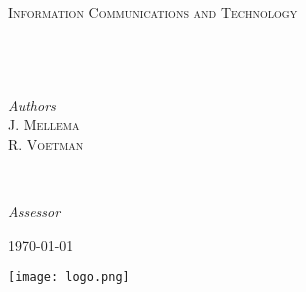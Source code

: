 \begin{titlepage}
	\center


	\textsc{\LARGE \university}\\[1.5cm]

	\textsc{\Large \course}\\[0.5cm]

	\textsc{\large Information Communications and Technology}\\[0.5cm]


	\HRule\\[0.4cm]

	{\huge\bfseries \report}\\[0.4cm]

	\HRule\\[1.5cm]


	\begin{minipage}{0.4\textwidth}
		\begin{flushleft}
			\large
			\textit{Authors}\\
			J. \textsc{Mellema}\\
			R. \textsc{Voetman}
		\end{flushleft}
	\end{minipage}
    ~
	\begin{minipage}{0.4\textwidth}
		\begin{flushright}
			\large
			\textit{Assessor}\\
			\assessorInitials \textsc{\assessorSurname}
		\end{flushright}
	\end{minipage}


	\vfill\vfill\vfill %

	{\large\today}


	\vfill\vfill
	\texttt{[image: logo.png]}\\[1cm]

\end{titlepage}
